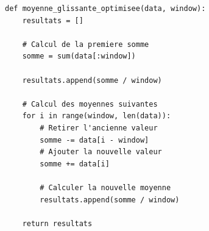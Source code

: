 \documentclass[
	fontsize=10pt, %
	twoside=true, %
]{kaobook}
\begin{document}
\begin{lstlisting}
def moyenne_glissante_optimisee(data, window):
    resultats = []

    # Calcul de la premiere somme
    somme = sum(data[:window])

    resultats.append(somme / window)

    # Calcul des moyennes suivantes
    for i in range(window, len(data)):
        # Retirer l'ancienne valeur
        somme -= data[i - window]
        # Ajouter la nouvelle valeur
        somme += data[i]

        # Calculer la nouvelle moyenne
        resultats.append(somme / window)

    return resultats
\end{lstlisting}

 


%
% 
%
\end{document}
